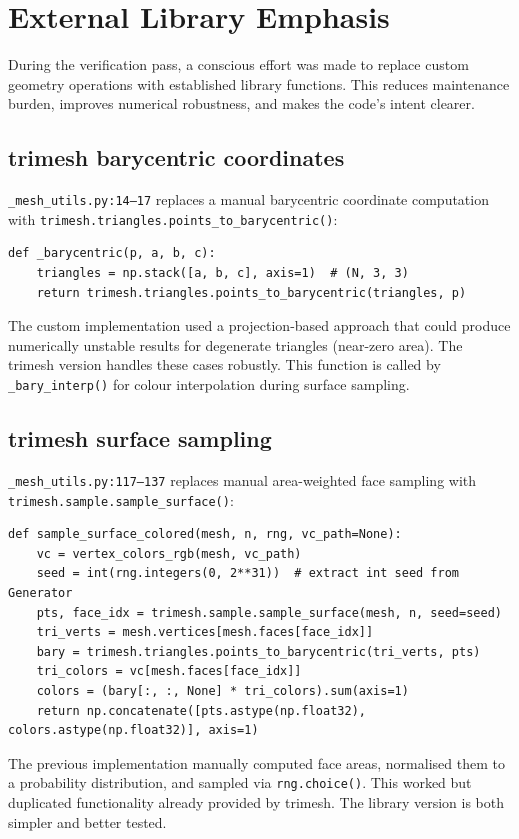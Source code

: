 \section{External Library Emphasis}

During the verification pass, a conscious effort was made to replace custom
geometry operations with established library functions. This reduces
maintenance burden, improves numerical robustness, and makes the code's
intent clearer.

\subsection{trimesh barycentric coordinates}

\texttt{\_mesh\_utils.py:14--17} replaces a manual barycentric coordinate
computation with \texttt{trimesh.triangles.points\_to\_barycentric()}:
\begin{lstlisting}
def _barycentric(p, a, b, c):
    triangles = np.stack([a, b, c], axis=1)  # (N, 3, 3)
    return trimesh.triangles.points_to_barycentric(triangles, p)
\end{lstlisting}
The custom implementation used a projection-based approach that could produce
numerically unstable results for degenerate triangles (near-zero area). The
trimesh version handles these cases robustly. This function is called by
\texttt{\_bary\_interp()} for colour interpolation during surface sampling.

\subsection{trimesh surface sampling}

\texttt{\_mesh\_utils.py:117--137} replaces manual area-weighted face
sampling with \texttt{trimesh.sample.sample\_surface()}:
\begin{lstlisting}
def sample_surface_colored(mesh, n, rng, vc_path=None):
    vc = vertex_colors_rgb(mesh, vc_path)
    seed = int(rng.integers(0, 2**31))  # extract int seed from Generator
    pts, face_idx = trimesh.sample.sample_surface(mesh, n, seed=seed)
    tri_verts = mesh.vertices[mesh.faces[face_idx]]
    bary = trimesh.triangles.points_to_barycentric(tri_verts, pts)
    tri_colors = vc[mesh.faces[face_idx]]
    colors = (bary[:, :, None] * tri_colors).sum(axis=1)
    return np.concatenate([pts.astype(np.float32), colors.astype(np.float32)], axis=1)
\end{lstlisting}
The previous implementation manually computed face areas, normalised them
to a probability distribution, and sampled via \texttt{rng.choice()}. This
worked but duplicated functionality already provided by trimesh. The
library version is both simpler and better tested.

